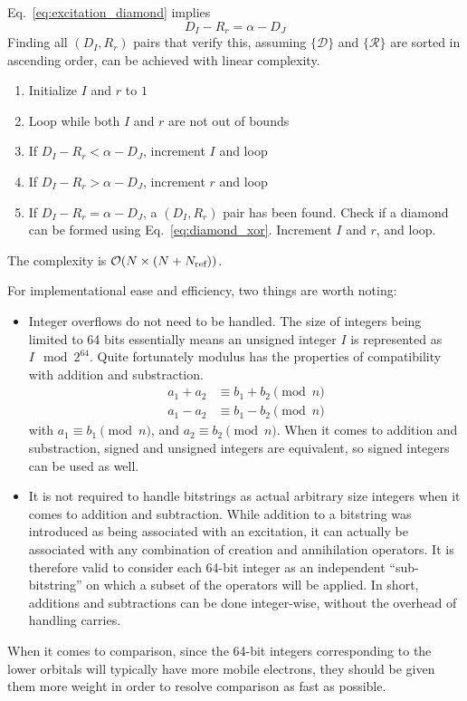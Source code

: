 \documentclass[./thesis.tex]{subfiles}
\begin{document}
Eq.~\eqref{eq:excitation_diamond} implies
\begin{equation}
D_I - R_r = \alpha - D_J 
\end{equation}
Finding all $(D_I, R_r)$ pairs that verify this, assuming $\{\mathcal{D}\}$ and $\{\mathcal{R}\}$ are sorted in ascending order, can be achieved with linear complexity.


\begin{enumerate}
\item
Initialize $I$ and $r$ to $1$
\item
Loop while both $I$ and $r$ are not out of bounds
\item
If $D_I - R_r < \alpha - D_J$, increment $I$ and loop
\item
If $D_I - R_r > \alpha - D_J$, increment $r$ and loop
\item
If $D_I - R_r = \alpha - D_J$, a $(D_I, R_r)$ pair has been found. Check if a diamond can be formed using Eq.~\eqref{eq:diamond_xor}. Increment $I$ and $r$, and loop.
\end{enumerate}
The complexity is $\mathcal{O}(N \times (N+{N_\text{ref}}))$.

For implementational ease and efficiency, two things are worth noting:
\begin{itemize}

\item
Integer overflows do not need to be handled. The size of integers being limited to 64 bits essentially means an unsigned integer $I$ is represented as $I \mod{2^{64}}$. Quite fortunately modulus has the properties of compatibility with addition and substraction.
\begin{align}
a_1 + a_2 &\equiv b_1 + b_2 \pmod{n} \\
a_1 - a_2 &\equiv b_1 - b_2 \pmod{n}
\end{align}
with $a_1 \equiv b_1 \pmod n$, and $a_2 \equiv b_2 \pmod n$. When it comes to addition and substraction, signed and unsigned integers are equivalent, so signed integers can be used as well.
\item
It is not required to handle bitstrings as actual arbitrary size integers when it comes to addition and subtraction. While addition to a bitstring was introduced as being associated with an excitation, it can actually be associated with any combination of creation and annihilation operators. It is therefore valid to consider each 64-bit integer as an independent ``sub-bitstring'' on which a subset of the operators will be applied. In short, additions and subtractions can be done integer-wise, without the overhead of handling carries.
\end{itemize}
When it comes to comparison, since the 64-bit integers corresponding to the lower orbitals will typically have more mobile electrons, they should be given them more weight in order to resolve comparison as fast as possible.
\end{document}
